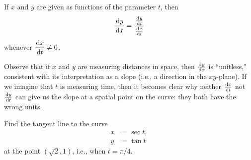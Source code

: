 \setcounter{chapter}{11}
\setcounter{section}{2}
\setcounter{theorem}{0}
\setcounter{equation}{0}


\begin{theorem}
If $x$ and $y$ are given as functions of the parameter $t$, then
\begin{equation*}
\frac{\mkern 2mu \mathrm{d} y}{\mkern 2mu \mathrm{d} x} = \frac{\frac{\mkern 2mu \mathrm{d} y}{\mkern 2mu \mathrm{d} t}}{\frac{\mkern 2mu \mathrm{d} x}{\mkern 2mu \mathrm{d} t}}
\end{equation*}
whenever $\displaystyle\frac{\mkern 2mu \mathrm{d} x}{\mkern 2mu \mathrm{d} t}\ne 0$.
\end{theorem}

\begin{remark}
Observe that if $x$ and $y$ are measuring distances in space, then $\frac{\mkern 2mu \mathrm{d} y}{\mkern 2mu \mathrm{d} x}$ is ``unitless," consistent with its interpretation as a slope (i.e., a direction in the $xy$-plane).
If we imagine that $t$ is measuring time, then it becomes clear why neither $\frac{\mkern 2mu \mathrm{d} x}{\mkern 2mu \mathrm{d} t}$ not $\frac{\mkern 2mu \mathrm{d} y}{\mkern 2mu \mathrm{d} t}$ can give us the slope at a spatial point on the curve: they both have the wrong units.
\end{remark}

\begin{example}
Find the tangent line to the curve
\begin{align*}
x &= \sec t,\\
y &= \tan t
\end{align*}
at the point $(\sqrt 2, 1)$, i.e., when $t=\pi/4$.
\end{example}
\ifdefined\SOLUTION
{}
\fi
\newpage


